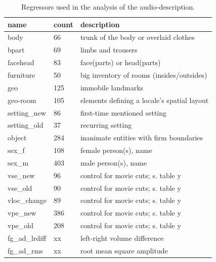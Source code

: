 \documentclass[english]{article}
\begin{document}
\begin{table}
\caption{Regressors used in the analysis of the audio-description. }
\begin{tabular}{lll}
\toprule
\textbf{name} & \textbf{count} & \textbf{description} \\
\midrule
body & 66 & trunk of the body or overlaid clothes \\
bpart & 69 & limbs and trousers \\
facehead & 83 & face(parts) or head(parts) \\
furniture & 50 & big inventory of rooms (insides/outsides) \\
geo & 125 & immobile landmarks \\
geo-room & 105 & elements defining a locale's spatial layout \\
setting\_new & 86 & first-time mentioned setting \\
setting\_old & 37 & recurring setting \\
object & 284 & inanimate entities with firm boundaries \\
sex\_f & 108 & female person(s), name \\
sex\_m & 403 & male person(s), name \\
vse\_new & 96 & control for movie cuts; s. table y \\
vse\_old & 90 & control for movie cuts; s. table y \\
vloc\_change & 89 & control for movie cuts; s. table y \\
vpe\_new & 386 & control for movie cuts; s. table y \\
vpe\_old & 208 & control for movie cuts; s. table y \\
fg\_ad\_lrdiff & xx &  left-right volume difference \\
fg\_ad\_rms & xx & root mean square amplitude \\
\bottomrule
\end{tabular}
\end{table}
\end{document}
